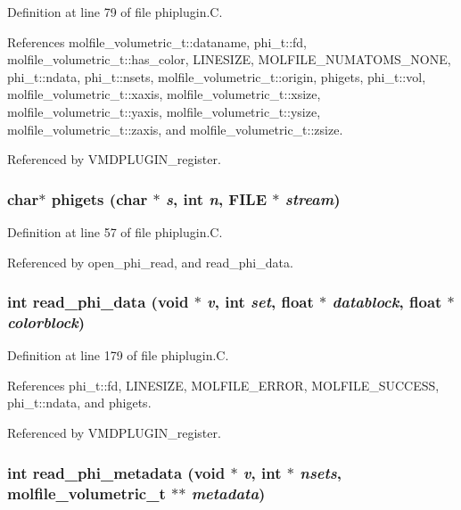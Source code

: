 Definition at line 79 of file phiplugin.C.

References molfile\_\-volumetric\_\-t::dataname, phi\_\-t::fd, molfile\_\-volumetric\_\-t::has\_\-color, LINESIZE, MOLFILE\_\-NUMATOMS\_\-NONE, phi\_\-t::ndata, phi\_\-t::nsets, molfile\_\-volumetric\_\-t::origin, phigets, phi\_\-t::vol, molfile\_\-volumetric\_\-t::xaxis, molfile\_\-volumetric\_\-t::xsize, molfile\_\-volumetric\_\-t::yaxis, molfile\_\-volumetric\_\-t::ysize, molfile\_\-volumetric\_\-t::zaxis, and molfile\_\-volumetric\_\-t::zsize.

Referenced by VMDPLUGIN\_\-register.
\subsubsection{\setlength{\rightskip}{0pt plus 5cm}char$\ast$ phigets (char $\ast$ {\em s}, int {\em n}, FILE $\ast$ {\em stream})\hspace{0.3cm}{\tt  [static]}}\label{phiplugin_8C_a2}




Definition at line 57 of file phiplugin.C.

Referenced by open\_\-phi\_\-read, and read\_\-phi\_\-data.
\subsubsection{\setlength{\rightskip}{0pt plus 5cm}int read\_\-phi\_\-data (void $\ast$ {\em v}, int {\em set}, float $\ast$ {\em datablock}, float $\ast$ {\em colorblock})\hspace{0.3cm}{\tt  [static]}}\label{phiplugin_8C_a5}




Definition at line 179 of file phiplugin.C.

References phi\_\-t::fd, LINESIZE, MOLFILE\_\-ERROR, MOLFILE\_\-SUCCESS, phi\_\-t::ndata, and phigets.

Referenced by VMDPLUGIN\_\-register.
\subsubsection{\setlength{\rightskip}{0pt plus 5cm}int read\_\-phi\_\-metadata (void $\ast$ {\em v}, int $\ast$ {\em nsets}, {\bf molfile\_\-volumetric\_\-t} $\ast$$\ast$ {\em metadata})\hspace{0.3cm}{\tt  [static]}}\label{phiplugin_8C_a4}




